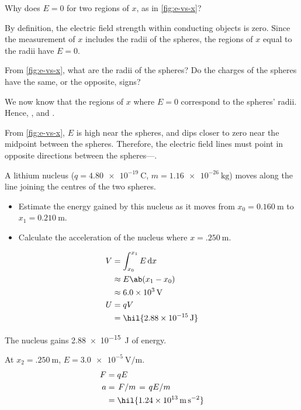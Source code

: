 \begin{problem}
Why does \(E = 0\) for two regions of \(x\), as in \cref{fig:e-vs-x}?
\end{problem}
By definition, the electric field strength within conducting objects is zero.
Since the measurement of \(x\) includes the radii of the spheres, the regions
of \(x\) equal to the radii have \(E = 0\).

\begin{problem}
From \cref{fig:e-vs-x}, what are the radii of the spheres? Do the charges
of the spheres have the same, or the opposite, signs?
\end{problem}
We now know that the regions of \(x\) where \(E = 0\) correspond to the spheres'
radii. Hence, , and .

From \cref{fig:e-vs-x}, \(E\) is high near the spheres, and dips closer to zero
near the midpoint between the spheres. Therefore, the electric field lines
must point in opposite directions between the spheres---.

\begin{problem}
A lithium nucleus (\(q = \qty{4.80e-19}{\coulomb}\), \(m = \qty{1.16e-26}{\kilogram}\)) moves
along the line joining the centres of the two spheres.
\begin{itemize}
	\item Estimate the energy gained by this nucleus as it moves from \(x_0 = \qty{0.160}{\metre}\)
	      to \(x_1 = \qty{0.210}{\metre}\).
	\item Calculate the acceleration of the nucleus where \(x = \qty{.250}{\metre}\).
\end{itemize}
\end{problem}

\begin{align*}
	V & = \int_{x_0}^{x_1} E\odif{x}   \\
	  & \approx E\ab(x_1 - x_0)        \\
	  & \approx \qty{6.0e3}{\volt}     \\
	U & = qV                           \\
	  & = \hil{\qty{2.88e-15}{\joule}}
\end{align*}

The nucleus gains \qty{2.88e-15}{\joule} of energy.

At \(x_2 = \qty{.250}{\metre}\), \(E = \qty{3.0e-5}{\volt\per\metre}\).
\begin{align*}
	F & = qE                                            \\
	a & = \lf{F}{m} = \lf{qE}{m}                        \\
	  & = \hil{\qty{1.24e13}{\metre\per\square\second}}
\end{align*}

